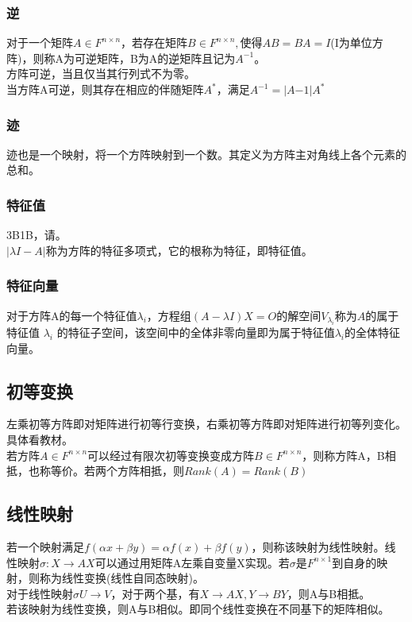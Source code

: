 \documentclass[UTF8]{ctexart}
\begin{document}
\subsubsection{逆}
对于一个矩阵$A\in F^{n\times n}$，若存在矩阵$B\in F^{n\times n},$使得$AB=BA=I$(I为单位方阵)，则称A为可逆矩阵，B为A的逆矩阵且记为$A^{-1}$。\\
\indent
方阵可逆，当且仅当其行列式不为零。\\
\indent
当方阵A可逆，则其存在相应的伴随矩阵$A^{*}$，满足$A^{-1}=|A{-1}|A^{*}$
\subsubsection{迹}
迹也是一个映射，将一个方阵映射到一个数。其定义为方阵主对角线上各个元素的总和。
\subsubsection{特征值}
3B1B，请。\\
\indent
$|\lambda I-A|$称为方阵的特征多项式，它的根称为特征，即特征值。
\subsubsection{特征向量}
对于方阵A的每一个特征值$\lambda_i$，方程组$(A-\lambda I)X=\mathit{O}$的解空间$V_{\lambda_{i}}$称为$A$的属于特征值 $\lambda_{i}$ 的特征子空间，该空间中的全体非零向量即为属于特征值$\lambda_{i}$的全体特征向量。
\subsection{初等变换}
左乘初等方阵即对矩阵进行初等行变换，右乘初等方阵即对矩阵进行初等列变化。具体看教材。\\
\indent
若方阵$A\in F^{n\times n}$可以经过有限次初等变换变成方阵$B\in F^{n\times n}$，则称方阵A，B相抵，也称等价。若两个方阵相抵，则$Rank(A)=Rank(B)$
\subsection{线性映射}
若一个映射满足$f(\alpha x+\beta y)=\alpha f(x)+\beta f(y)$，则称该映射为线性映射。线性映射$\sigma:X\rightarrow AX$可以通过用矩阵A左乘自变量X实现。若$\sigma$是$F^{n\times 1}$到自身的映射，则称为线性变换(线性自同态映射)。\\
\indent
对于线性映射$\sigma U\rightarrow V$，对于两个基，有$X\rightarrow AX,Y\rightarrow BY$，则A与B相抵。\\
\indent
若该映射为线性变换，则A与B相似。即同个线性变换在不同基下的矩阵相似。
\end{document}
